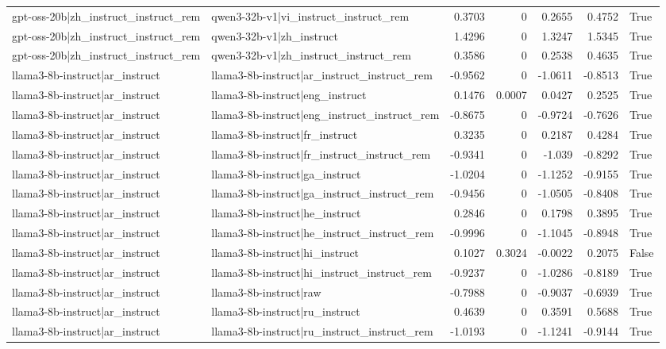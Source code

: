 \begin{table}
\begin{tabular}{l l r r r r l}
gpt-oss-20b|zh_instruct_instruct_rem & qwen3-32b-v1|vi_instruct_instruct_rem & 0.3703 & 0 & 0.2655 & 0.4752 & True \\
gpt-oss-20b|zh_instruct_instruct_rem & qwen3-32b-v1|zh_instruct & 1.4296 & 0 & 1.3247 & 1.5345 & True \\
gpt-oss-20b|zh_instruct_instruct_rem & qwen3-32b-v1|zh_instruct_instruct_rem & 0.3586 & 0 & 0.2538 & 0.4635 & True \\
llama3-8b-instruct|ar_instruct & llama3-8b-instruct|ar_instruct_instruct_rem & -0.9562 & 0 & -1.0611 & -0.8513 & True \\
llama3-8b-instruct|ar_instruct & llama3-8b-instruct|eng_instruct & 0.1476 & 0.0007 & 0.0427 & 0.2525 & True \\
llama3-8b-instruct|ar_instruct & llama3-8b-instruct|eng_instruct_instruct_rem & -0.8675 & 0 & -0.9724 & -0.7626 & True \\
llama3-8b-instruct|ar_instruct & llama3-8b-instruct|fr_instruct & 0.3235 & 0 & 0.2187 & 0.4284 & True \\
llama3-8b-instruct|ar_instruct & llama3-8b-instruct|fr_instruct_instruct_rem & -0.9341 & 0 & -1.039 & -0.8292 & True \\
llama3-8b-instruct|ar_instruct & llama3-8b-instruct|ga_instruct & -1.0204 & 0 & -1.1252 & -0.9155 & True \\
llama3-8b-instruct|ar_instruct & llama3-8b-instruct|ga_instruct_instruct_rem & -0.9456 & 0 & -1.0505 & -0.8408 & True \\
llama3-8b-instruct|ar_instruct & llama3-8b-instruct|he_instruct & 0.2846 & 0 & 0.1798 & 0.3895 & True \\
llama3-8b-instruct|ar_instruct & llama3-8b-instruct|he_instruct_instruct_rem & -0.9996 & 0 & -1.1045 & -0.8948 & True \\
llama3-8b-instruct|ar_instruct & llama3-8b-instruct|hi_instruct & 0.1027 & 0.3024 & -0.0022 & 0.2075 & False \\
llama3-8b-instruct|ar_instruct & llama3-8b-instruct|hi_instruct_instruct_rem & -0.9237 & 0 & -1.0286 & -0.8189 & True \\
llama3-8b-instruct|ar_instruct & llama3-8b-instruct|raw & -0.7988 & 0 & -0.9037 & -0.6939 & True \\
llama3-8b-instruct|ar_instruct & llama3-8b-instruct|ru_instruct & 0.4639 & 0 & 0.3591 & 0.5688 & True \\
llama3-8b-instruct|ar_instruct & llama3-8b-instruct|ru_instruct_instruct_rem & -1.0193 & 0 & -1.1241 & -0.9144 & True \\

\end{tabular}
\end{table}
